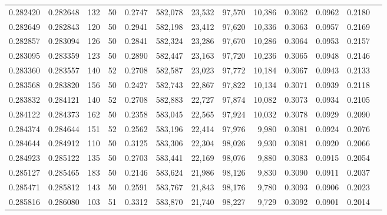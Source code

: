 \begin{tabular}{rrrrrrrrrrrrr}
0.282420 & 0.282648 &   132 &  50 &                                     0.2747 & 582,078 &  23,532 &  97,570 &  10,386 & 0.3062 & 0.0962 & 0.2180 \\
0.282649 & 0.282843 &   120 &  50 &                                     0.2941 & 582,198 &  23,412 &  97,620 &  10,336 & 0.3063 & 0.0957 & 0.2169 \\
0.282857 & 0.283094 &   126 &  50 &                                     0.2841 & 582,324 &  23,286 &  97,670 &  10,286 & 0.3064 & 0.0953 & 0.2157 \\
0.283095 & 0.283359 &   123 &  50 &                                     0.2890 & 582,447 &  23,163 &  97,720 &  10,236 & 0.3065 & 0.0948 & 0.2146 \\
0.283360 & 0.283557 &   140 &  52 &                                     0.2708 & 582,587 &  23,023 &  97,772 &  10,184 & 0.3067 & 0.0943 & 0.2133 \\
0.283568 & 0.283820 &   156 &  50 &                                     0.2427 & 582,743 &  22,867 &  97,822 &  10,134 & 0.3071 & 0.0939 & 0.2118 \\
0.283832 & 0.284121 &   140 &  52 &                                     0.2708 & 582,883 &  22,727 &  97,874 &  10,082 & 0.3073 & 0.0934 & 0.2105 \\
0.284122 & 0.284373 &   162 &  50 &                                     0.2358 & 583,045 &  22,565 &  97,924 &  10,032 & 0.3078 & 0.0929 & 0.2090 \\
0.284374 & 0.284644 &   151 &  52 &                                     0.2562 & 583,196 &  22,414 &  97,976 &   9,980 & 0.3081 & 0.0924 & 0.2076 \\
0.284644 & 0.284912 &   110 &  50 &                                     0.3125 & 583,306 &  22,304 &  98,026 &   9,930 & 0.3081 & 0.0920 & 0.2066 \\
0.284923 & 0.285122 &   135 &  50 &                                     0.2703 & 583,441 &  22,169 &  98,076 &   9,880 & 0.3083 & 0.0915 & 0.2054 \\
0.285127 & 0.285465 &   183 &  50 &                                     0.2146 & 583,624 &  21,986 &  98,126 &   9,830 & 0.3090 & 0.0911 & 0.2037 \\
0.285471 & 0.285812 &   143 &  50 &                                     0.2591 & 583,767 &  21,843 &  98,176 &   9,780 & 0.3093 & 0.0906 & 0.2023 \\
0.285816 & 0.286080 &   103 &  51 &                                     0.3312 & 583,870 &  21,740 &  98,227 &   9,729 & 0.3092 & 0.0901 & 0.2014 \\

\end{tabular}
